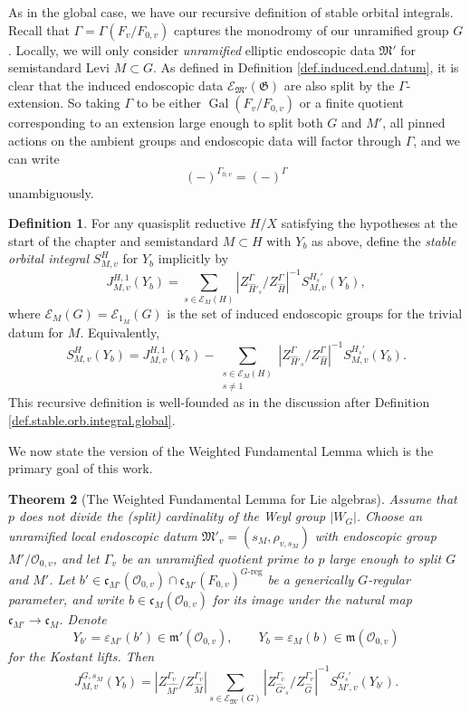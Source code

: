 \documentclass[openany]{amsbook}
\newtheorem{theorem}{Theorem}[chapter]
\theoremstyle{definition}
\newtheorem{definition}[theorem]{Definition}
\theoremstyle{remark}
\numberwithin{equation}{section}
\renewcommand{\O}{\mathcal{O}}
\newcommand{\cE}{\mathcal{E}}
\newcommand{\Gal}{\operatorname{Gal}}
\renewcommand{\epsilon}{\varepsilon}
\renewcommand{\-}{\operatorname{-}}
\newcommand{\fm}{\mathfrak{m}}
\newcommand{\fc}{\mathfrak{c}}
\renewcommand{\fm}{\mathfrak{m}}
\newcommand{\fM}{\mathfrak{M}}
\newcommand{\fG}{\mathfrak{G}}
\newcommand{\Greg}{G\text{-reg}}
\begin{document}
As in the global case, we have our recursive definition of stable orbital integrals. Recall that $\Gamma = \Gamma(F_v/F_{0,v})$ captures the monodromy of our unramified group $G$. Locally, we will only consider \emph{unramified} elliptic endoscopic data $\fM'$ for semistandard Levi $M \subset G$. As defined in Definition \ref{def.induced.end.datum}, it is clear that the induced endoscopic data $\cE_{\fM'}(\fG)$ are also split by the $\Gamma$-extension. So taking $\Gamma$ to be either $\Gal(F_v/F_{0,v})$ or a finite quotient corresponding to an extension large enough to split both $G$ and $M'$, all pinned actions on the ambient groups and endoscopic data will factor through $\Gamma$, and we can write
$$
    (-)^{\Gamma_{0,v}} = (-)^{\Gamma}
$$
unambiguously.

\begin{definition}\label{def.stable.integral.local}
    For any quasisplit reductive $H/X$ satisfying the hypotheses at the start of the chapter and semistandard $M \subset H$ with $Y_b$ as above, define the \emph{stable orbital integral} $S_{M,v}^H$ for $Y_b$ implicitly by
    $$
        J_{M,v}^{H,1}(Y_b) = \sum_{s \in \cE_{M}(H)} |Z_{\widehat{H}'_s}^\Gamma/Z_{\widehat{H}}^\Gamma |^{-1} S_{M,v}^{H_s'}(Y_b),
    $$
    where $\cE_M(G) = \cE_{1_M}(G)$ is the set of induced endoscopic groups for the trivial datum for $M$. Equivalently,
    $$
        S_{M,v}^H(Y_b) = J_{M,v}^{H,1}(Y_b) - \sum_{\substack{s \in \cE_M(H) \\ s \neq 1}} | Z_{\widehat{H}'_s}^\Gamma/Z_{\widehat{H}}^\Gamma|^{-1} S_{M,v}^{H_s'}(Y_b).
    $$
    This recursive definition is well-founded as in the discussion after Definition \ref{def.stable.orb.integral.global}.
\end{definition}


We now state the version of the Weighted Fundamental Lemma which is the primary goal of this work. 

\begin{theorem}[The Weighted Fundamental Lemma for Lie algebras]\label{thm.wfl}
    Assume that $p$ does not divide the (split) cardinality of the Weyl group $|W_G|$. Choose an unramified local endoscopic datum $\fM'_v = (s_M, \rho_{v,s_M})$ with endoscopic group $M'/\O_{0,v}$, and let $\Gamma_v$ be an unramified quotient prime to $p$ large enough to split $G$ and $M'$. Let $b' \in \fc_{M'}(\O_{0,v}) \cap \fc_{M'}(F_{0,v})^{\Greg}$ be a generically $G$-regular parameter, and write $b \in \fc_M(\O_{0,v})$ for its image under the natural map $\fc_{M'} \to \fc_M$. Denote
    $$
        Y_{b'} = \epsilon_{M'}(b') \in \fm'(\O_{0,v}), \qquad Y_{b} = \epsilon_{M}(b) \in \fm(\O_{0,v})
    $$
    for the Kostant lifts. Then
    \begin{equation}
        J_{M,v}^{G,s_M}(Y_b) = |Z_{\widehat{M'}}^{\Gamma_v}/Z_{\widehat{M}}^{\Gamma_v} |\sum_{s \in \cE_{\fM'}(G)} |Z_{\widehat{G}'_s}^{\Gamma_v}/Z_{\widehat{G}}^{\Gamma_v} |^{-1} S_{M',v}^{G_s'}(Y_{b'}).\label{eqn.local.wfl}
    \end{equation}
\end{theorem}
\end{document}
